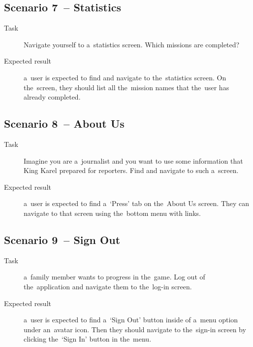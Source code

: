 \subsection*{Scenario 7~-- Statistics}

\begin{description}
    \item[Task] Navigate yourself to a~statistics screen.
    Which missions are completed?
    \item[Expected result] a~user is expected to
    find and navigate to the~statistics screen.
    On the~screen,
    they should list all the~mission names that the~user has already completed.
\end{description}

\subsection*{Scenario 8~-- About Us}

\begin{description}
    \item[Task] Imagine you are a~journalist
    and you want to use some information
    that King Karel prepared for reporters.
    Find and navigate to such a~screen.
    \item[Expected result] a~user is expected to
    find a~\enquote*{Press} tab on the~About Us screen.
    They can navigate to that screen using the~bottom menu with links.
\end{description}

\subsection*{Scenario 9~-- Sign Out}

\begin{description}
    \item[Task] a~family member wants to progress in the~game.
    Log out of the~application
    and navigate them to the~log-in screen.
    \item[Expected result] a~user is expected to
    find a~\enquote*{Sign Out} button inside of a~menu option under an~avatar icon.
    Then they should navigate to the~sign-in screen
    by clicking the~\enquote*{Sign In} button in the~menu.    
\end{description}
